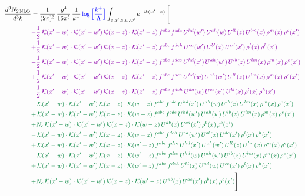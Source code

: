 \documentclass[10pt]{article}
\numberwithin{equation}{section}
\newcommand{\new}[1]{{\color{blue}#1}}
\begin{document}
\begin{align}
\frac{d^{3}N_{2\,\mathrm{NLO}}}{d^{3}k} & = \frac{1}{(2\pi)^{3}}\,\frac{g^{4}}{16\pi^{5}}\,\frac{1}{k^{+}}\,\new{\log\Big[\frac{k^{+}}{\Lambda}\Big]}\int_{x,x',z,w,w'}e^{-ik(w'-w)}\,\Bigg[\notag\\ &{\color{CC} -\frac{1}{2}\,\mathcal{K}(x'-w)\cdot\mathcal{K}(x'-w')\,\mathcal{K}(x-z)\cdot\mathcal{K}(x'-z)\,f^{abc}\,f^{cde}\,U^{hd}(w')\,U^{ah}(w)\,U^{lb}(z)\,U^{lm}(x)\,\rho^{m}(x)\,\rho^{e}(x')} \notag\\
&{\color{CC} +\frac{1}{2}\,\mathcal{K}(x'-w)\cdot\mathcal{K}(x'-w')\,\mathcal{K}(x-z)\cdot\mathcal{K}(x'-z)\,f^{abc}\,f^{deh}\,U^{ea}(w')\,U^{bl}(x)\,U^{cd}(x')\,\rho^{l}(x)\,\rho^{h}(x')} \notag\\
&{\color{CC} -\frac{1}{2}\,\mathcal{K}(x'-w)\cdot\mathcal{K}(x'-w')\,\mathcal{K}(x-z)\cdot\mathcal{K}(x'-z)\,f^{abc}\,f^{dce}\,U^{hd}(x')\,U^{ah}(w')\,U^{lb}(z)\,U^{lm}(x)\,\rho^{m}(x)\,\rho^{e}(x')} \notag\\
&{\color{CC} +\frac{1}{2}\,\mathcal{K}(x'-w)\cdot\mathcal{K}(x'-w')\,\mathcal{K}(x-z)\cdot\mathcal{K}(x'-z)\,f^{abc}\,f^{dce}\,U^{hd}(w)\,U^{ah}(w')\,U^{lb}(z)\,U^{lm}(x)\,\rho^{m}(x)\,\rho^{e}(x')} \notag\\
&{\color{CC} -\frac{1}{2}\,\mathcal{K}(x'-w)\cdot\mathcal{K}(x'-w')\,\mathcal{K}(x-z)\cdot\mathcal{K}(x'-z)\,f^{abc}\,f^{deh}\,U^{da}(w)\,U^{ce}(x')\,U^{bl}(x)\,\rho^{l}(x)\,\rho^{h}(x')} \notag\\
&{\color{JIM} -\,\mathcal{K}(x'-w)\cdot\mathcal{K}(x'-w')\,\mathcal{K}(x-z)\cdot\mathcal{K}(w-z)\,f^{abc}\,f^{cde}\,U^{hd}(x')\,U^{ah}(w)\,U^{lb}(z)\,U^{lm}(x)\,\rho^{m}(x)\,\rho^{e}(x')} \notag \\ &{\color{JIM}  +\,\mathcal{K}(x'-w)\cdot\mathcal{K}(x'-w')\,\mathcal{K}(x-z)\cdot\mathcal{K}(w-z)\,f^{abc}\,f^{cde}\,U^{hd}(w')\,U^{ah}(w)\,U^{lb}(z)\,U^{lm}(x)\,\rho^{m}(x)\,\rho^{e}(x')} \notag\\
&{\color{JIM} +N_{c}\,\mathcal{K}(x'-w)\cdot\mathcal{K}(x'-w')\,\mathcal{K}(x-z)\cdot\mathcal{K}(w-z)\,U^{ab}(x)\,U^{ca}(x')\,\rho^{b}(x)\,\rho^{c}(x')} \notag\\
&{\color{JIM} -\,\mathcal{K}(x'-w)\cdot\mathcal{K}(x'-w')\,\mathcal{K}(x-z)\cdot\mathcal{K}(w-z)\,f^{abc}\,f^{deh}\,U^{ea}(w')\,U^{bl}(x)\,U^{dc}(x')\,\rho^{l}(x)\,\rho^{h}(x')} \notag\\
&{\color{JIM} +\,\mathcal{K}(x'-w)\cdot\mathcal{K}(x'-w')\,\mathcal{K}(x-z)\cdot\mathcal{K}(w'-z)\,f^{abc}\,f^{dce}\,U^{hd}(x')\,U^{ah}(w')\,U^{lb}(z)\,U^{lm}(x)\,\rho^{m}(x)\,\rho^{e}(x')} \notag\\
&{\color{JIM} -\,\mathcal{K}(x'-w)\cdot\mathcal{K}(x'-w')\,\mathcal{K}(x-z)\cdot\mathcal{K}(w'-z)\,f^{abc}\,f^{dce}\,U^{hd}(w)\,U^{ah}(w')\,U^{lb}(z)\,U^{lm}(x)\,\rho^{m}(x)\,\rho^{e}(x')} \notag\\
&{\color{JIM} +\,\mathcal{K}(x'-w)\cdot\mathcal{K}(x'-w')\,\mathcal{K}(x-z)\cdot\mathcal{K}(w'-z)\,f^{abc}\,f^{deh}\,U^{bl}(x)\,U^{ad}(w)\,U^{ce}(x')\,\rho^{l}(x)\,\rho^{h}(x')} \notag\\
&{\color{JIM} +N_{c}\,\mathcal{K}(x'-w)\cdot\mathcal{K}(x'-w')\,\mathcal{K}(x-z)\cdot\mathcal{K}(w'-z)\,U^{ab}(x)\,U^{ac}(x')\,\rho^{b}(x)\,\rho^{c}(x')}\Bigg] \end{align}
\end{document}
